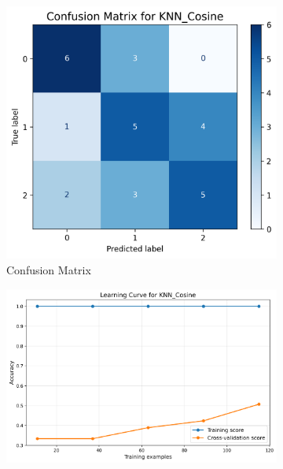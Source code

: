 \documentclass[10pt]{article}
\begin{document}
    \begin{figure}[!ht]
        \begin{subfigure}{0.33\textwidth}
            \centering
            \includegraphics[width=\textwidth]{code/ResultsMainAugZip/plots/Block3_Probabilistic_Experiment_II/confusion_matrix_KNN_Cosine.png}
            \caption{Confusion Matrix}
        \end{subfigure}
        \begin{subfigure}{0.33\textwidth}
            \centering
            \includegraphics[width=\textwidth]{code/ResultsMainAugZip/plots/Block3_Probabilistic_Experiment_II/learning_curve_KNN_Cosine.png}

\end{subfigure}
\end{figure}
\end{document}
